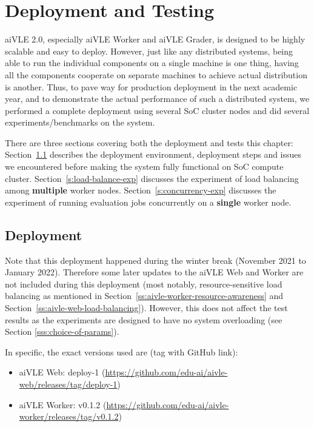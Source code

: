 \chapter{Deployment and Testing}
\label{ch:deployment-and-testing}
aiVLE 2.0, especially aiVLE Worker and aiVLE Grader, is designed to be highly scalable and easy to deploy. However, just like any distributed systems, being able to run the individual components on a single machine is one thing, having all the components cooperate on separate machines to achieve actual distribution is another. Thus, to pave way for production deployment in the next academic year, and to demonstrate the actual performance of such a distributed system, we performed a complete deployment using several SoC cluster nodes and did several experiments/benchmarks on the system.

There are three sections covering both the deployment and tests this chapter: Section~\ref{s:deployment} describes the deployment environment, deployment steps and issues we encountered before making the system fully functional on SoC compute cluster. Section~\ref{s:load-balance-exp} discusses the experiment of load balancing among \textbf{multiple} worker nodes. Section~\ref{s:concurrency-exp} discusses the experiment of running evaluation jobs concurrently on a \textbf{single} worker node.

\section{Deployment}
\label{s:deployment}
Note that this deployment happened during the winter break (November 2021 to January 2022). Therefore some later updates to the aiVLE Web and Worker are not included during this deployment (most notably, resource-sensitive load balancing as mentioned in Section~\ref{ss:aivle-worker-resource-awareness} and Section~\ref{ss:aivle-web-load-balancing}). However, this does not affect the test results as the experiments are designed to have no system overloading (see Section \ref{sss:choice-of-params}).

In specific, the exact versions used are (tag with GitHub link):
\begin{itemize}
    \item aiVLE Web: deploy-1 (\href{https://github.com/edu-ai/aivle-web/releases/tag/deploy-1}{https://github.com/edu-ai/aivle-web/releases/tag/deploy-1})
    \item aiVLE Worker: v0.1.2 (\href{https://github.com/edu-ai/aivle-worker/releases/tag/v0.1.2}{https://github.com/edu-ai/aivle-worker/releases/tag/v0.1.2})
\end{itemize}

